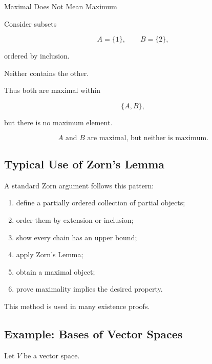 \begin{workedexamplebox}{Maximal Does Not Mean Maximum}

Consider subsets

\[
A=\{1\},
\qquad
B=\{2\},
\]

ordered by inclusion.

Neither contains the other.

Thus both are maximal within

\[
\{A,B\},
\]

but there is no maximum element.

\begin{answerbox}
\[
\boxed{
A
\text{ and }
B
\text{ are maximal, but neither is maximum.}
}
\]
\end{answerbox}

\end{workedexamplebox}

\subsection{Typical Use of Zorn's Lemma}
\label{subsec:typical-zorn-use}

A standard Zorn argument follows this pattern:

\begin{enumerate}
    \item define a partially ordered collection of partial objects;
    \item order them by extension or inclusion;
    \item show every chain has an upper bound;
    \item apply Zorn's Lemma;
    \item obtain a maximal object;
    \item prove maximality implies the desired property.
\end{enumerate}

This method is used in many existence proofs.

\subsection{Example: Bases of Vector Spaces}
\label{subsec:zorn-vector-space-basis}

Let \(V\) be a vector space.

